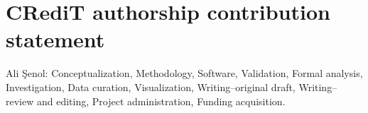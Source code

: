 \documentclass[preprint,11pt,authoryear]{elsarticle}
\begin{document}
\section*{CRediT authorship contribution statement}
Ali \c{S}enol: Conceptualization, Methodology, Software, Validation, Formal
analysis, Investigation, Data curation, Visualization, Writing--original draft,
Writing--review and editing, Project administration, Funding acquisition.



\end{document}
